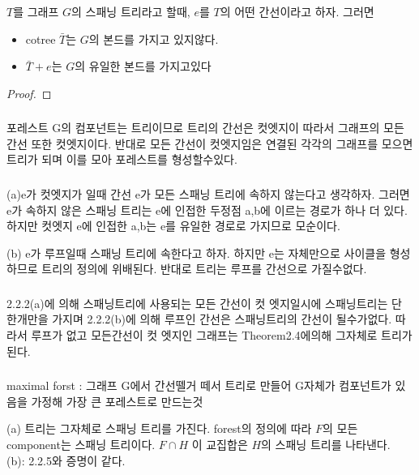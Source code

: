 \begin{theorem}
    $T$를 그래프 $G$의 스패닝 트리라고 할때, $e$를 $T$의 어떤 간선이라고 하자. 그러면
    \begin{itemize}
        \item cotree $\bar{T}$는 $G$의 본드를 가지고 있지않다.        
        \item $\bar{T}+e$는 $G$의 유일한 본드를 가지고있다
    \end{itemize}
\end{theorem}

\begin{proof}
    
\end{proof}

\subsubsection{}
포레스트 G의 컴포넌트는 트리이므로 트리의 간선은 컷엣지이 따라서 그래프의 모든 간선 또한 컷엣지이다.
반대로 모든 간선이 컷엣지임은 연결된 각각의 그래프를 모으면 트리가 되며 이를 모아 포레스트를 형성할수있다.
\subsubsection{}
(a)e가 컷엣지가 일때 간선 e가 모든 스패닝 트리에 속하지 않는다고 생각하자.
그러면 e가 속하지 않은 스패닝 트리는 e에 인접한 두정점 a,b에 이르는 경로가 하나 더 있다. 하지만 컷엣지 e에 인접한 a,b는 e를 유일한 경로로 가지므로 모순이다.

(b) e가 루프일때 스패닝 트리에 속한다고 하자. 하지만 e는 자체만으로 사이클을 형성 하므로 트리의 정의에 위배된다. 반대로 트리는 루프를 간선으로 가질수없다.
\subsubsection{}
2.2.2(a)에 의해 스패닝트리에 사용되는 모든 간선이 컷 엣지일시에 스패닝트리는 단 한개만을 가지며 2.2.2(b)에 의해 루프인 간선은 스패닝트리의 간선이 될수가없다. 따라서 루프가 없고 모든간선이 컷 엣지인 그래프는 Theorem2.4에의해 그자체로 트리가 된다.
\subsubsection{}
maximal forst : 그래프 G에서 간선뗄거 떼서 트리로 만들어 G자체가 컴포넌트가 있음을 가정해 가장 큰 포레스트로 만드는것 

(a) 트리는 그자체로 스패닝 트리를 가진다. forest의 정의에 따라 $F$의 모든 component는 스패닝 트리이다. $F \cap H$ 이 교집합은 $H$의 스패닝 트리를 나타낸다.\\
(b): 2.2.5와 증명이 같다.

